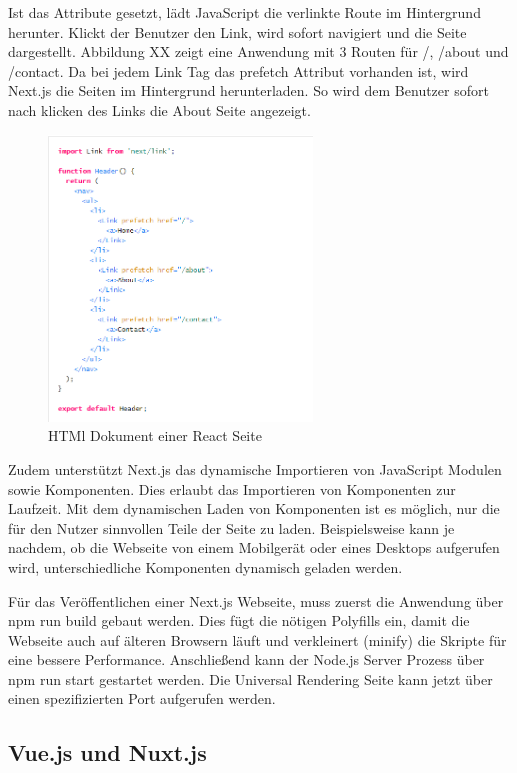 \documentclass[runningheads]{llncs}
\begin{document}
Ist das Attribute gesetzt, 
lädt JavaScript die verlinkte Route im Hintergrund herunter. 
Klickt der Benutzer den Link, 
wird sofort navigiert und die Seite dargestellt. 
Abbildung XX zeigt eine Anwendung mit 3 Routen für /, /about und /contact. 
Da bei jedem Link Tag das prefetch Attribut vorhanden ist, 
wird Next.js die Seiten im Hintergrund herunterladen. 
So wird dem Benutzer sofort nach klicken des Links die About Seite angezeigt.
\begin{figure}
  \centering
  \includegraphics[width=7cm]{images/prefetchnext}
  \caption{HTMl Dokument einer React Seite}
\end{figure}

Zudem unterstützt Next.js das dynamische Importieren von JavaScript Modulen sowie Komponenten. 
Dies erlaubt das Importieren von Komponenten zur Laufzeit. 
Mit dem dynamischen Laden von Komponenten ist es möglich, 
nur die für den Nutzer sinnvollen Teile der Seite zu laden. 
Beispielsweise kann je nachdem, 
ob die Webseite von einem Mobilgerät oder eines Desktops aufgerufen wird, 
unterschiedliche Komponenten dynamisch geladen werden. 

Für das Veröffentlichen einer Next.js Webseite, 
muss zuerst die Anwendung über npm run build gebaut werden. 
Dies fügt die nötigen Polyfills ein, 
damit die Webseite auch auf älteren Browsern läuft und 
verkleinert (minify) die Skripte für eine bessere Performance. 
Anschließend kann der Node.js Server Prozess über npm run start gestartet werden. 
Die Universal Rendering Seite kann jetzt über einen spezifizierten Port aufgerufen werden.

\subsection{Vue.js und Nuxt.js}
\label{subsec:Vue.js und Nuxt.js}
\end{document}
